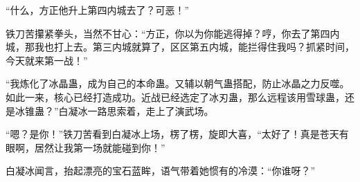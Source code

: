 \begin{this_body}
“什么，方正他升上第四内城去了？可恶！”

铁刀苦攥紧拳头，当然不甘心：“方正，你以为你能逃得掉？哼，你去了第四内城，那我也打上去。第三内城就算了，区区第五内城，能拦得住我吗？抓紧时间，今天就来第一战！”

“我炼化了冰晶蛊，成为自己的本命蛊。又辅以朝气蛊搭配，防止冰晶之力反噬。如此一来，核心已经打造成功。近战已经选定了冰刃蛊，那么远程该用雪球蛊，还是冰锥蛊？”白凝冰一路思索着，走上了演武场。

“嗯？是你！”铁刀苦看到白凝冰上场，楞了楞，旋即大喜，“太好了！真是苍天有眼啊，居然让我第一场就能碰到你！”

白凝冰闻言，抬起漂亮的宝石蓝眸，语气带着她惯有的冷漠：“你谁呀？”

\end{this_body}

